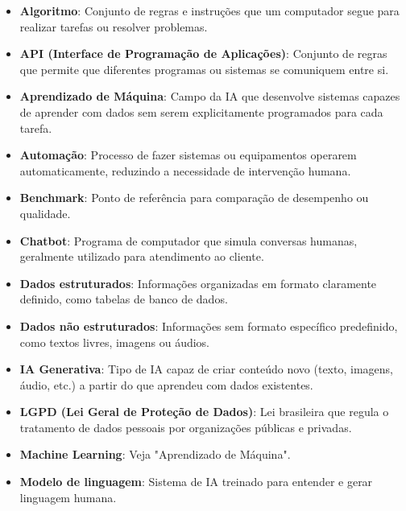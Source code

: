 \documentclass[12pt,a4paper]{book}
\begin{document}
\begin{itemize}
    \item \textbf{Algoritmo}: Conjunto de regras e instruções que um computador segue para realizar tarefas ou resolver problemas.
    
    \item \textbf{API (Interface de Programação de Aplicações)}: Conjunto de regras que permite que diferentes programas ou sistemas se comuniquem entre si.
    
    \item \textbf{Aprendizado de Máquina}: Campo da IA que desenvolve sistemas capazes de aprender com dados sem serem explicitamente programados para cada tarefa.
    
    \item \textbf{Automação}: Processo de fazer sistemas ou equipamentos operarem automaticamente, reduzindo a necessidade de intervenção humana.
    
    \item \textbf{Benchmark}: Ponto de referência para comparação de desempenho ou qualidade.
    
    \item \textbf{Chatbot}: Programa de computador que simula conversas humanas, geralmente utilizado para atendimento ao cliente.
    
    \item \textbf{Dados estruturados}: Informações organizadas em formato claramente definido, como tabelas de banco de dados.
    
    \item \textbf{Dados não estruturados}: Informações sem formato específico predefinido, como textos livres, imagens ou áudios.
    
    \item \textbf{IA Generativa}: Tipo de IA capaz de criar conteúdo novo (texto, imagens, áudio, etc.) a partir do que aprendeu com dados existentes.
    
    \item \textbf{LGPD (Lei Geral de Proteção de Dados)}: Lei brasileira que regula o tratamento de dados pessoais por organizações públicas e privadas.
    
    \item \textbf{Machine Learning}: Veja "Aprendizado de Máquina".
    
    \item \textbf{Modelo de linguagem}: Sistema de IA treinado para entender e gerar linguagem humana.
    

\end{itemize}
\end{document}
